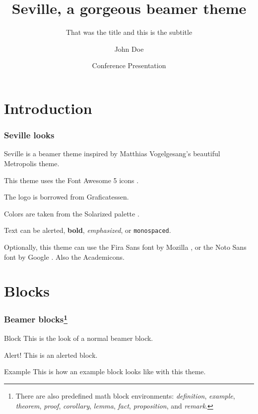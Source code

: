 \documentclass{beamer}
\title{Seville, a gorgeous beamer theme}
\subtitle{That was the title and this is the subtitle}
\author{John Doe}
\date{Conference Presentation \the\year{}}
\institute{University of \LaTeX}
\begin{document}
\begin{frame}

    \titlepage

\end{frame}

\section{Introduction}

\begin{frame}
    \frametitle{Seville looks}

    Seville is a beamer theme inspired by Matthias Vogelgesang's beautiful Metropolis theme.

    This theme uses the Font Awesome 5 icons \faFontAwesome{}.

    The logo is borrowed from Graficatessen.

    Colors are taken from the Solarized palette \faPalette.

    Text can be \alert{alerted}, \textbf{bold}, \emph{emphasized}, or \texttt{monospaced}.

    Optionally, this theme can use the Fira Sans font by Mozilla \faFirefox, or the Noto Sans font by Google \faGoogle. Also the Academicons.

\end{frame}

\section{Blocks}

\begin{frame}
    \frametitle{Beamer blocks\footnote{There are also predefined math block environments: \emph{definition}, \emph{example}, \emph{theorem}, \emph{proof}, \emph{corollary}, \emph{lemma}, \emph{fact}, \emph{proposition}, and \emph{remark}.}}

    \begin{block}{Block}
        This is the look of a normal beamer block.
    \end{block}

    \begin{alertblock}{Alert!}
        This is an alerted block.
    \end{alertblock}

    \begin{exampleblock}{Example}
        This is how an example block looks like with this theme.
    \end{exampleblock}

\end{frame}
\end{document}
